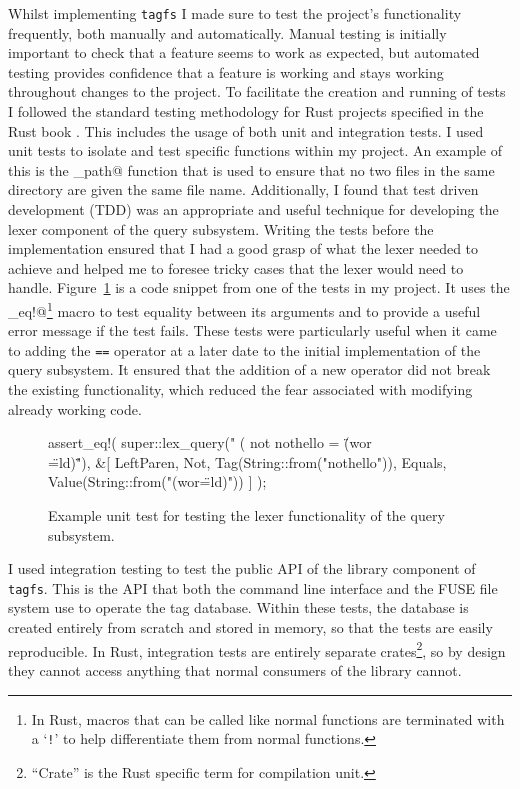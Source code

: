 Whilst implementing \texttt{tagfs} I made sure to test the project's
functionality frequently, both manually and automatically. Manual testing is
initially important to check that a feature seems to work as expected, but
automated testing provides confidence that a feature is working and stays
working throughout changes to the project. To facilitate the creation and
running of tests I followed the standard testing methodology for Rust projects
specified in the Rust book \cite{rust-testing}. This includes the usage of both
unit and integration tests. I used unit tests to isolate and test specific
functions within my project. An example of this is the \verb@sanitise_path@
function that is used to ensure that no two files in the same directory are
given the same file name. Additionally, I found that test driven development
(TDD) was an appropriate and useful technique for developing the lexer
component of the query subsystem. Writing the tests before the implementation
ensured that I had a good grasp of what the lexer needed to achieve and helped
me to foresee tricky cases that the lexer would need to handle.
Figure~\ref{fig:example-unit-test} is a code snippet from one of the tests in
my project. It uses the \verb@assert_eq!@\footnote{In Rust, macros that can be
called like normal functions are terminated with a `\texttt{!}' to help
differentiate them from normal functions.} macro to test equality between its
arguments and to provide a useful error message if the test fails. These tests
were particularly useful when it came to adding the \texttt{==} operator at a
later date to the initial implementation of the query subsystem. It ensured
that the addition of a new operator did not break the existing functionality,
which reduced the fear associated with modifying already working code.

\begin{figure}
    \centering
    \begin{boxedverbatim}
assert_eq!(
    super::lex_query("      (     not nothello   = \"(wor\\\"=ld)\""),
    &[
        LeftParen, Not, Tag(String::from("nothello")), Equals,
        Value(String::from("(wor\"=ld)"))
    ]
);
    \end{boxedverbatim}
    \caption[Example unit test]{Example unit test for testing the lexer
        functionality of the query subsystem.}
    \label{fig:example-unit-test}
\end{figure}

I used integration testing to test the public API of the library component of
\texttt{tagfs}. This is the API that both the command line interface and the
FUSE file system use to operate the tag database. Within these tests, the
database is created entirely from scratch and stored in memory, so that the
tests are easily reproducible. In Rust, integration tests are entirely separate
crates\footnote{``Crate'' is the Rust specific term for compilation unit.}, so
by design they cannot access anything that normal consumers of the library
cannot.

